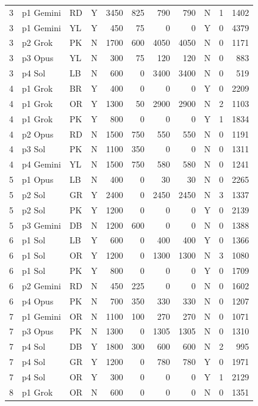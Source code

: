 \begin{longtable}{r l l l r r r r l r r}
3 & p1 Gemini & RD & Y & 3450 & 825 & 790 & 790 & N & 1 & 1402 \\
3 & p1 Gemini & YL & Y & 450 & 75 & 0 & 0 & Y & 0 & 4379 \\
3 & p2 Grok & PK & N & 1700 & 600 & 4050 & 4050 & N & 0 & 1171 \\
3 & p3 Opus & YL & N & 300 & 75 & 120 & 120 & N & 0 & 883 \\
3 & p4 Sol & LB & N & 600 & 0 & 3400 & 3400 & N & 0 & 519 \\
4 & p1 Grok & BR & Y & 400 & 0 & 0 & 0 & Y & 0 & 2209 \\
4 & p1 Grok & OR & Y & 1300 & 50 & 2900 & 2900 & N & 2 & 1103 \\
4 & p1 Grok & PK & Y & 800 & 0 & 0 & 0 & Y & 1 & 1834 \\
4 & p2 Opus & RD & N & 1500 & 750 & 550 & 550 & N & 0 & 1191 \\
4 & p3 Sol & PK & N & 1100 & 350 & 0 & 0 & N & 0 & 1311 \\
4 & p4 Gemini & YL & N & 1500 & 750 & 580 & 580 & N & 0 & 1241 \\
5 & p1 Opus & LB & N & 400 & 0 & 30 & 30 & N & 0 & 2265 \\
5 & p2 Sol & GR & Y & 2400 & 0 & 2450 & 2450 & N & 3 & 1337 \\
5 & p2 Sol & PK & Y & 1200 & 0 & 0 & 0 & Y & 0 & 2139 \\
5 & p3 Gemini & DB & N & 1200 & 600 & 0 & 0 & N & 0 & 1388 \\
6 & p1 Sol & LB & Y & 600 & 0 & 400 & 400 & Y & 0 & 1366 \\
6 & p1 Sol & OR & Y & 1200 & 0 & 1300 & 1300 & N & 3 & 1080 \\
6 & p1 Sol & PK & Y & 800 & 0 & 0 & 0 & Y & 0 & 1709 \\
6 & p2 Gemini & RD & N & 450 & 225 & 0 & 0 & N & 0 & 1602 \\
6 & p4 Opus & PK & N & 700 & 350 & 330 & 330 & N & 0 & 1207 \\
7 & p1 Gemini & OR & N & 1100 & 100 & 270 & 270 & N & 0 & 1071 \\
7 & p3 Opus & PK & N & 1300 & 0 & 1305 & 1305 & N & 0 & 1310 \\
7 & p4 Sol & DB & Y & 1800 & 300 & 600 & 600 & N & 2 & 995 \\
7 & p4 Sol & GR & Y & 1200 & 0 & 780 & 780 & Y & 0 & 1971 \\
7 & p4 Sol & OR & Y & 300 & 0 & 0 & 0 & Y & 1 & 2129 \\
8 & p1 Grok & OR & N & 600 & 0 & 0 & 0 & N & 0 & 1351 \\

\end{longtable}
